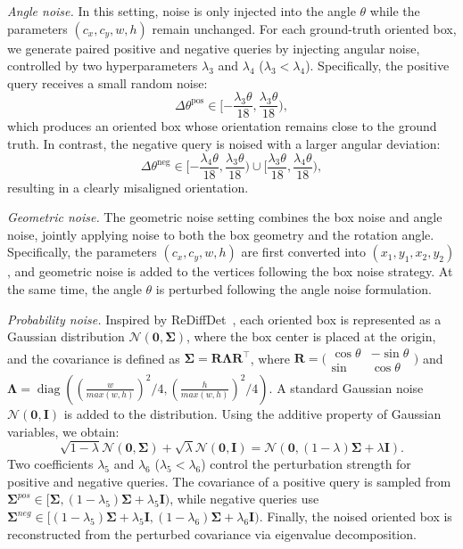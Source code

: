 \documentclass[lettersize,journal]{IEEEtran}
\begin{document}
\textit{Angle noise.} 
In this setting, noise is only injected into the angle $\theta$ while the parameters $(c_x,c_y,w,h)$ remain unchanged. For each ground-truth oriented box, we generate paired positive and negative queries by injecting angular noise, controlled by two hyperparameters $\lambda_3$ and $\lambda_4$ ($\lambda_3 < \lambda_4$). Specifically, the positive query receives a small random noise:
\begin{equation}
\Delta\theta^{\text{pos}}\in[-\frac{\lambda_3\theta}{18}, \frac{\lambda_3\theta}{18}),
\end{equation}
which produces an oriented box whose orientation remains close to the ground truth. In contrast, the negative query is noised with a larger angular deviation:
\begin{equation}
\Delta\theta^{\text{neg}}\in[-\frac{\lambda_4\theta}{18}, \frac{\lambda_3\theta}{18})\cup[\frac{\lambda_3\theta}{18}, \frac{\lambda_4\theta}{18}),
\end{equation}
resulting in a clearly misaligned orientation.

\textit{Geometric noise.}
The geometric noise setting combines the box noise and angle noise, jointly applying noise to both the box geometry and the rotation angle. Specifically, the parameters $(c_x,c_y,w,h)$ are first converted into $(x_1,y_1,x_2,y_2)$, and geometric noise is added to the vertices following the box noise strategy. At the same time, the angle $\theta$ is perturbed following the angle noise formulation.

\textit{Probability noise.}
Inspired by ReDiffDet~\cite{rediffdet}, each oriented box is represented as a Gaussian distribution $\mathcal{N}(\mathbf{0}, \boldsymbol{\Sigma})$, where the box center is placed at the origin, and the covariance is defined as $\boldsymbol{\Sigma} = \mathbf{R} \mathbf{\Lambda}
 \mathbf{R}^\top$, where $\mathbf{R}=\bigl( \begin{smallmatrix} \cos \theta & -\sin \theta \\ \sin & \cos \theta \end{smallmatrix} \bigr)$ and $\mathbf{\Lambda} = \operatorname{diag}((\frac{w}{max(w,h)})^2/4, (\frac{h}{max(w,h)})^2/4)$. A standard Gaussian noise $\mathcal{N}(\mathbf{0},\mathbf{I})$ is added to the distribution. Using the additive property of Gaussian variables, we obtain:
\begin{equation}
  \sqrt{1-\lambda}\mathcal{N}(\mathbf{0}, \boldsymbol{\Sigma}) + \sqrt{\lambda} \mathcal{N}(\mathbf{0}, \mathbf{I}) = \mathcal{N}(\mathbf{0}, (1-\lambda)\boldsymbol{\Sigma}+\lambda\mathbf{I}).
\end{equation}
Two coefficients $\lambda_5$ and $\lambda_6$ ($\lambda_5 < \lambda_6$) control the perturbation strength for positive and negative queries. The covariance of a positive query is sampled from $\boldsymbol{\Sigma}^{pos}\in[\boldsymbol{\Sigma},(1-\lambda_5)\boldsymbol{\Sigma}+\lambda_5\mathbf{I})$, while negative queries use $\boldsymbol{\Sigma}^{neg}\in[(1-\lambda_5)\boldsymbol{\Sigma}+\lambda_5\mathbf{I},(1-\lambda_6)\boldsymbol{\Sigma}+\lambda_6\mathbf{I})$. Finally, the noised oriented box is reconstructed from the perturbed covariance via eigenvalue decomposition.
\end{document}
